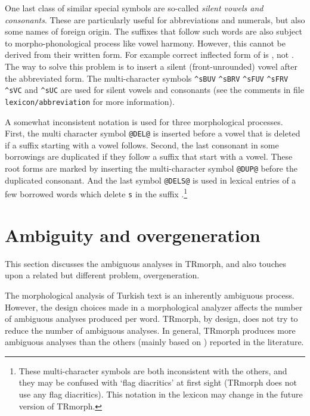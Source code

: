 \documentclass[twocolumn]{article}
\begin{document}
One last class of similar special symbols are so-called \emph{silent
vowels and consonants}. These are particularly useful for
abbreviations and numerals, but also some names of foreign origin. The
suffixes that follow such words are also subject to
morpho-phonological process like vowel harmony. However, this cannot
be derived from their written form. For example correct inflected form
of  is , not . The
way to solve this problem is to insert a silent (front-unrounded)
vowel after the abbreviated form. The multi-character symbols
\texttt{\^{}sBUV} \texttt{\^{}sBRV} \texttt{\^{}sFUV} \texttt{\^{}sFRV}
\texttt{\^{}sVC} and \texttt{\^{}sUC} are used for silent vowels and
consonants (see the comments in file \lstinline{lexicon/abbreviation}
for more information).

A somewhat inconsistent notation is used for three morphological
processes. First, the multi character symbol \texttt{@DEL@} is
inserted before a vowel that is deleted if a suffix starting with a
vowel follows. Second, the last consonant in some borrowings are
duplicated if they follow a suffix that start with a vowel. These root
forms are marked by inserting the multi-character symbol
\texttt{@DUP@} before the duplicated consonant. And the last symbol
\texttt{@DELS@} is used in lexical entries of a few borrowed words
which delete \texttt{s} in the suffix .\footnote{These
multi-character symbols are both inconsistent with the others, and
they may be confused with `flag diacritics' at first sight (TRmorph 
does not use any flag diacritics). This notation in the lexicon may
change in the future version of TRmorph.}


\section{\label{sec:ambiguity}Ambiguity and overgeneration}

This section
discusses the ambiguous analyses in TRmorph, and also touches upon a
related but different problem, overgeneration.

The morphological analysis of Turkish text is an inherently ambiguous
process. However, the design choices made in a morphological analyzer
affects the number of ambiguous analyses produced per word.  TRmorph,
by design, does not try to reduce the number of ambiguous analyses. In
general, TRmorph produces more ambiguous analyses than the others
(mainly based on \cite{oflazer1994}) reported in the literature. 
\end{document}
